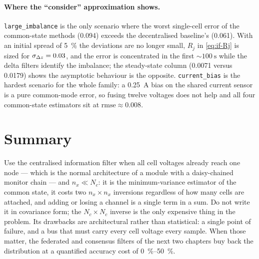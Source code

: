 \paragraph{Where the ``consider'' approximation shows.} \texttt{large\_imbalance} is the only
scenario where the worst single-cell error of the common-state methods (\num{0.094}) exceeds the
decentralised baseline's (\num{0.061}). With an initial spread of \SI{5}{\percent} the
deviations are no longer small, $R_j$ in \eqref{eq:if-Rj} is sized for
$\sigma_{\Delta z}=\num{0.03}$, and the error is concentrated in the first
$\sim\SI{100}{\second}$ while the delta filters identify the imbalance; the steady-state column
(\num{0.0071} versus \num{0.0179}) shows the asymptotic behaviour is the opposite.
\texttt{current\_bias} is the hardest scenario for the whole family: a \SI{0.25}{\ampere} bias on
the shared current sensor is a pure common-mode error, so fusing twelve voltages does not help
and all four common-state estimators sit at $\text{rmse}\approx\num{0.008}$.

\section{Summary}
Use the centralised information filter when all cell voltages already reach one node --- which is
the normal architecture of a module with a daisy-chained monitor chain --- and $n_x \ll N_c$: it
is the minimum-variance estimator of the common state, it costs two $n_x\times n_x$ inversions
regardless of how many cells are attached, and adding or losing a channel is a single term in a
sum. Do not write it in covariance form; the $N_c\times N_c$ inverse is the only expensive thing
in the problem. Its drawbacks are architectural rather than statistical: a single point of
failure, and a bus that must carry every cell voltage every sample. When those matter, the
federated and consensus filters of the next two chapters buy back the distribution at a
quantified accuracy cost of \SIrange{0}{50}{\percent}.

